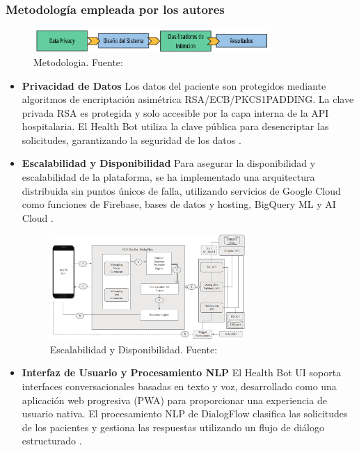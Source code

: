 	\subsubsection{Metodología empleada por los autores}	
		\begin{figure}[H]
		\begin{center}
			\includegraphics[width=0.8\textwidth]{2/1_antecedentes/Metodologia-1.png}
			\caption{Metodologia. Fuente: \cite{Medbot-2020} }
		\end{center}
	\end{figure}
	\vspace{-10mm}
		\begin{itemize}			
				\item \textbf{Privacidad de Datos}
				Los datos del paciente son protegidos mediante algoritmos de encriptación asimétrica RSA/ECB/PKCS1PADDING. La clave privada RSA es protegida y solo accesible por la capa interna de la API hospitalaria. El Health Bot utiliza la clave pública para desencriptar las solicitudes, garantizando la seguridad de los datos .
		
				\item \textbf{Escalabilidad y Disponibilidad}
				Para asegurar la disponibilidad y escalabilidad de la plataforma, se ha implementado una arquitectura distribuida sin puntos únicos de falla, utilizando servicios de Google Cloud como funciones de Firebase, bases de datos y hosting, BigQuery ML y AI Cloud .
		
					\begin{figure}[H]
						\begin{center}
							\includegraphics[width=0.7\textwidth]{2/1_antecedentes/Escalabilidad y Disponibilidad.png}
							\caption{Escalabilidad y Disponibilidad. Fuente: \cite{HealthChatBots-2022}}
						\end{center}
					\end{figure}
				\vspace{-10mm}
				\item \textbf{Interfaz de Usuario y Procesamiento NLP}
				El Health Bot UI soporta interfaces conversacionales basadas en texto y voz, desarrollado como una aplicación web progresiva (PWA) para proporcionar una experiencia de usuario nativa. El procesamiento NLP de DialogFlow clasifica las solicitudes de los pacientes y gestiona las respuestas utilizando un flujo de diálogo estructurado .
		

\end{itemize}
